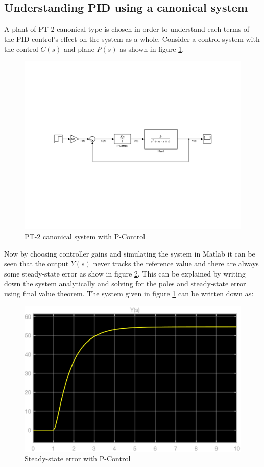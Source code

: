 \subsection{Understanding PID using a canonical system}

A plant of PT-2 canonical type is chosen in order to understand each terms of the PID control's effect on the system as a whole.
Consider a control system with the control $C(s)$ and plane $P(s)$ as shown in figure \ref{Fig_UnderstandingPID_P}.
\begin{figure}[h!]
	\centering
	\includegraphics[width=\linewidth]{Bilder/Understanding_PID_Control.pdf}
	\caption{PT-2 canonical system with P-Control}
	\label{Fig_UnderstandingPID_P}
\end{figure}
Now by choosing controller gains and simulating the system in Matlab it can be seen that the output $Y(s)$ never tracks the reference value and there are always some steady-state error as show in figure \ref{Fig_UnderstandingPID_P_ss_smallK}. This can be explained by writing down the system analytically and solving for the poles and steady-state error using final value theorem. The system given in figure \ref{Fig_UnderstandingPID_P} can be written down as:
\begin{figure}[h!]
	\centering
	\includegraphics[width=\linewidth]{Bilder/UnderstandingPID_P_smallK.eps}
	\caption{Steady-state error with P-Control}
	\label{Fig_UnderstandingPID_P_ss_smallK}
\end{figure}

